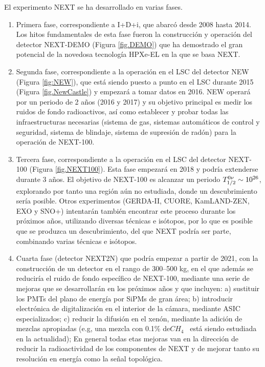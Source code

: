 El experimento NEXT se ha desarrollado en varias fases. 
 \begin{enumerate}
\item Primera fase, correspondiente a I+D+i, que abarcó desde 2008 hasta 2014. Los hitos fundamentales de esta fase fueron la construcción y operación del detector NEXT-DEMO (Figura \ref{fig.DEMO}) que ha demostrado el gran potencial de la novedosa tecnología HPXe-EL en la que se basa NEXT. 
\item Segunda fase, correspondiente a la operación en el LSC del detector NEW (Figura \ref{fig:NEW}), que está siendo puesto a punto en el LSC durante 2015 (Figura \ref{fig.NewCastle}) y empezará a tomar datos en 2016. NEW operará por un periodo de 2 años (2016 y 2017) y su objetivo principal es medir los ruidos de fondo radioactivos, así como establecer y probar todas las infraestructuras necesarias (sistema de gas, sistemas automáticos de control y seguridad, sistema de blindaje, sistema de supresión de radón) para la operación de NEXT-100.
\item Tercera fase, correspondiente a  la operación en el LSC del detector NEXT-100  (Figura \ref{fig.NEXT100}). Esta fase empezará en 2018 y podría extenderse durante 3 años.
 El objetivo de NEXT-100 es alcanzar un periodo 
$T_{1/2}^{0\nu} \sim 10^{26}$, explorando por tanto una región aún no estudiada, donde un descubrimiento sería posible.  Otros experimentos (GERDA-II, CUORE, KamLAND-ZEN, EXO y SNO+) intentarán también encontrar este proceso durante los próximos años, utilizando diversas técnicas e isótopos, por lo que es posible que se produzca un descubrimiento, del que NEXT podría ser parte, combinando varias técnicas e isótopos. 
\item Cuarta fase (detector NEXT2N) que podría empezar a partir de 2021, con la construcción de un detector en el rango de 300--500 kg, en el que además se reduciría el ruido de fondo específico de NEXT-100, mediante una serie de mejoras que se desarrollarán en los próximos años y que incluyen: a) sustituir los PMTs del plano de energía por SiPMs de gran área; b) introducir electrónica de digitalización en el interior de la cámara, mediante ASIC especializados; c) reducir la difusión en el xenón, mediante la adición de mezclas apropiadas (e.g, una mezcla con 0.1\% de$CH_4$~ está siendo estudiada en la actualidad); En general todas etas mejoras van en la dirección de reducir la radioactividad de los componentes de NEXT y de mejorar tanto su resolución en energía como la señal topológica. 
\end{enumerate}


